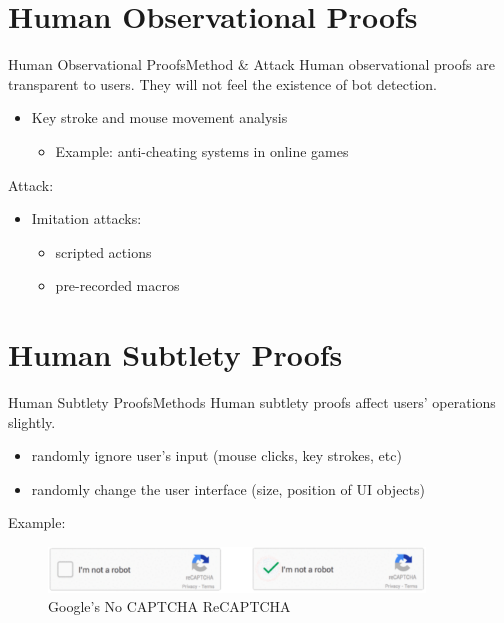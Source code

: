 \documentclass{beamer}
\begin{document}
  \section{Human Observational Proofs}
  \begin{frame}{Human Observational Proofs}{Method \& Attack}
    Human observational proofs are transparent to users. They will not feel the existence of bot detection.
    \begin{itemize}
      \item Key stroke and mouse movement analysis
      \begin{itemize}
        \item Example: anti-cheating systems in online games
      \end{itemize}
    \end{itemize} \par
    \pause
    Attack:
    \begin{itemize}
      \item Imitation attacks:
      \begin{itemize}
        \item scripted actions
        \item pre-recorded macros
      \end{itemize}
    \end{itemize}
  \end{frame}

  \section{Human Subtlety Proofs}
  \begin{frame}{Human Subtlety Proofs}{Methods}
    Human subtlety proofs affect users' operations slightly.
    \begin{itemize}[<+->]
      \item randomly ignore user's input (mouse clicks, key strokes, etc)
      \item randomly change the user interface (size, position of UI objects)
    \end{itemize}
    \pause
    Example:
    \begin{figure}
        \includegraphics[width=10cm]{nocaptcha_recaptcha.png}
        \caption{Google's No CAPTCHA ReCAPTCHA}
    \end{figure}
  \end{frame}
\end{document}
